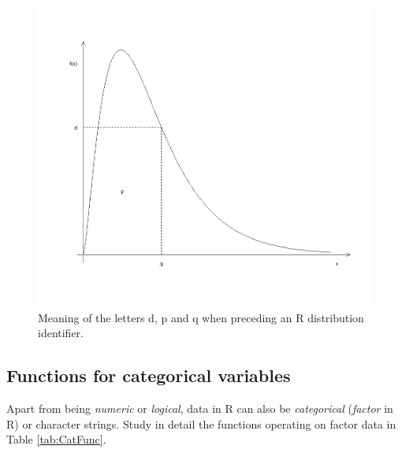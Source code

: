 \documentclass[
]{book}
\begin{document}
\begin{figure}
\includegraphics[width=1\linewidth]{pics/F-distribution} \caption{Meaning of the letters d, p and q when preceding an R distribution identifier.}\label{fig:Fdist}
\end{figure}

\subsection{Functions for categorical variables}\label{areagrp}

Apart from being \emph{{numeric}} or \emph{{logical}}, data in R can also be \emph{{categorical}} (\emph{{factor}} in R) or character strings. Study in detail the functions operating on factor data in Table \ref{tab:CatFunc}.
\end{document}
